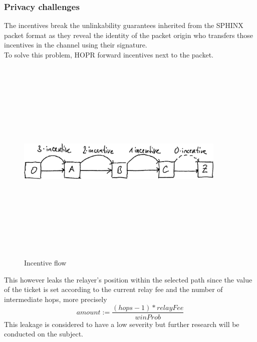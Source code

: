 \subsubsection*{Privacy challenges}
The incentives break the unlinkability guarantees inherited from the SPHINX packet format as they reveal the identity of the packet origin who transfers those incentives in the channel using their signature. 
\\To solve this problem, HOPR forward incentives next to the packet.
\begin{figure}[H]
    \centering
    \includegraphics[width=10cm,height=10cm,keepaspectratio]{../whitepaper/images/token-workflow.png}
    \caption{Incentive flow}
    \label{fig:Incentive flow}
    \end{figure}

    \hspace{-5mm}This however leaks the relayer’s position within the selected path since the value of the ticket is set according to the current relay fee and the number of intermediate hops, 
more precisely $$amount:=\frac{(hops -1)* relayFee}{winProb}$$
This leakage is considered to have a low severity but further research will be conducted on the subject.







